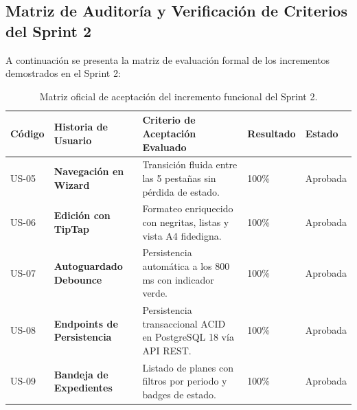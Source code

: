 \documentclass[12pt,a4paper]{article}
\begin{document}
\subsection{Matriz de Auditoría y Verificación de Criterios del Sprint 2}
A continuación se presenta la matriz de evaluación formal de los incrementos demostrados en el Sprint 2:
\begin{table}[H]
\centering
\small
\renewcommand{\arraystretch}{1.2}
\begin{tabularx}{\textwidth}{|>{\hsize=0.3\hsize\centering\arraybackslash\footnotesize}X|>{\hsize=1.0\hsize\raggedright\arraybackslash\bfseries\footnotesize}X|>{\hsize=1.8\hsize\raggedright\arraybackslash\footnotesize}X|>{\hsize=0.45\hsize\centering\arraybackslash\footnotesize}X|>{\hsize=0.45\hsize\centering\arraybackslash\footnotesize}X|}
\hline
\rowcolor{tableheader}
\textbf{Código} & \textbf{Historia de Usuario} & \textbf{Criterio de Aceptación Evaluado} & \textbf{Resultado} & \textbf{Estado} \\
\hline
US-05 & Navegación en Wizard & Transición fluida entre las 5 pestañas sin pérdida de estado. & 100\% & Aprobada \\
\hline
US-06 & Edición con TipTap & Formateo enriquecido con negritas, listas y vista A4 fidedigna. & 100\% & Aprobada \\
\hline
US-07 & Autoguardado Debounce & Persistencia automática a los 800 ms con indicador verde. & 100\% & Aprobada \\
\hline
US-08 & Endpoints de Persistencia & Persistencia transaccional ACID en PostgreSQL 18 vía API REST. & 100\% & Aprobada \\
\hline
US-09 & Bandeja de Expedientes & Listado de planes con filtros por periodo y badges de estado. & 100\% & Aprobada \\
\hline
\end{tabularx}
\caption{Matriz oficial de aceptación del incremento funcional del Sprint 2.}
\label{tab:sprint2_matrix}
\end{table}
\end{document}

